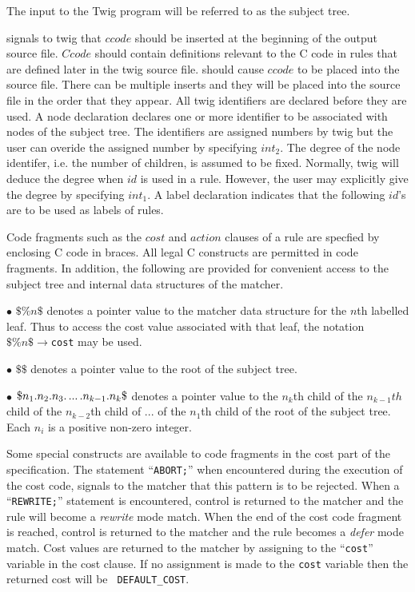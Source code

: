 The input to the Twig program will be referred to as the subject tree.
\medskip
{}

\noindent{}
\medskip
\noindent signals to twig that $ccode$ should be inserted at the
beginning of the output source file.  $Ccode$ should contain
definitions relevant to the C code in
rules that are defined later in the twig source file.
\medskip
\noindent{}
\medskip
\noindent should cause $ccode$ to be placed into the source file.
There can be multiple inserts and they will be placed into the source
file
in the order that they appear.
\medskip
{}
All twig identifiers are declared before they are used.
\medskip
{}
\medskip
\noindent A node declaration declares one or more identifier to be
associated with nodes of the subject tree.  The identifiers are
assigned numbers by twig but the user can overide the assigned number
by specifying $int_2$.  The degree of the node identifer, i.e. the
number of children, is assumed to be fixed.  Normally, twig will
deduce the degree when $id$ is used in a rule.  However, the user may
explicitly give the degree by specifying $int_1$.
\medskip
{}
\medskip
A label declaration indicates that the following $id$'s are to be used
as labels of rules.
\medskip{}

Code fragments such as the $cost$ and $action$ clauses of a rule are
specfied by enclosing C code in braces.  All legal C constructs are
permitted in code fragments.  In addition, the following are provided
for convenient access to the subject tree and internal data
structures of the matcher.
\smallskip
{\parindent=0pt
$\bullet$ $\$\%n\$$ denotes a pointer value to the matcher data
structure for the $n$th labelled leaf.  Thus to access the cost value
associated with that leaf, the notation $\$\%n\$\to${\tt cost} may be used.

$\bullet$ $\$\$$ denotes a pointer value to the root of the subject
tree.

$\bullet$ $\$n_1.n_2.n_3.\, \hbox{...}\,.n_{k-1}.n_k\$$ denotes
a pointer value to the $n_k$th child of the $n_{k-1}th$ child of the
$n_{k-2}$th child of \hbox{...} of the $n_1$th child of the root of
the subject tree.  Each $n_i$ is a positive non-zero integer.
}
\medskip

Some special constructs are available to code fragments in the cost
part of the specification.  The
statement ``{\tt ABORT;}'' when encountered during the execution of
the cost code, signals to the matcher that this pattern is to be
rejected.  When a ``{\tt REWRITE;}'' statement is encountered, control
is returned to the matcher and the rule will become a {\sl rewrite}
mode match.  When the end of the cost code fragment is reached,
control is returned to the matcher and the rule becomes a {\sl defer}
mode match.  Cost values are returned to the matcher by assigning to
the ``{\tt cost}'' variable in the cost clause.  If no assignment is
made to the {\tt cost} variable then the returned cost will be {\tt
DEFAULT\_COST}.

